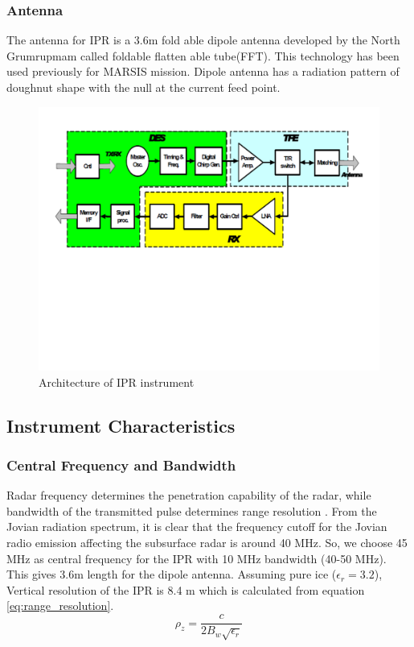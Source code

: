 \subsubsection{Antenna}
The antenna for \ac{IPR} is a 3.6m fold able dipole antenna developed by the North Grumrupmam called foldable flatten able tube(FFT). This technology  has been used previously for \ac{MARSIS} mission. Dipole antenna has a radiation pattern of doughnut shape with the null at the  current feed point.
\begin{figure}[bht]
\centering
\includegraphics[scale=0.5]{Figures/IPR_Architecture.pdf}
\caption{Architecture of \ac{IPR} instrument \cite{IPR_performance}}
\label{fig:IPR_achitecture}
\end{figure}
%
\subsection{Instrument Characteristics}
\subsubsection{Central Frequency and Bandwidth}
Radar frequency determines the penetration capability of the radar, while bandwidth of the transmitted pulse determines range resolution \cite{penetrartion}. From the Jovian radiation spectrum, it is clear that the frequency cutoff for the Jovian radio
emission affecting the subsurface radar is around 40 MHz. So, we choose 45 MHz as central frequency for the \ac{IPR} with 10 MHz bandwidth (40-50 MHz). This gives 3.6m length for the dipole antenna. Assuming pure ice ($\epsilon_{r} = 3.2$), Vertical resolution of the \ac{IPR} is 8.4 m which is calculated from equation \ref{eq:range_resolution}.
%
\begin{equation}
\rho_{z} = \dfrac{c}{2B_{w}\sqrt{\epsilon_{r}}}
\label{eq:range_resolution}
\end{equation}
%
